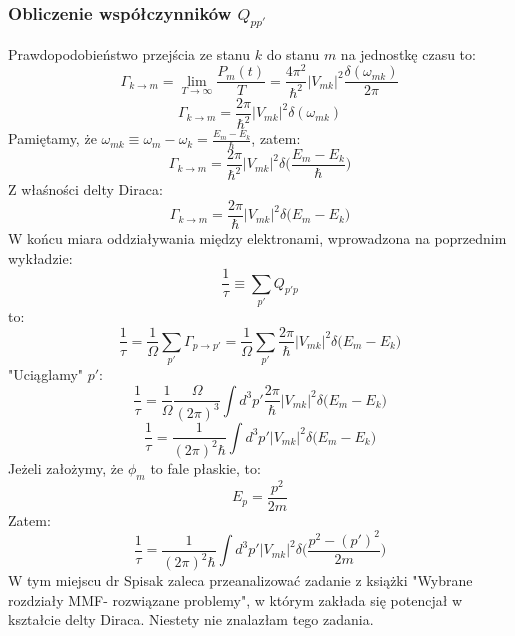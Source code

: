 \subsubsection{Obliczenie współczynników $Q_{pp'}$}
Prawdopodobieństwo przejścia ze stanu $k$ do stanu $m$ na jednostkę czasu to:
\begin{equation}\Gamma_{k\rightarrow m}=\lim_{T\rightarrow\infty}\frac{P_m(t)}{T}=
\frac{4\pi^2}{\hbar^2}|V_{mk}|^2\frac{\delta(\omega_{mk})}{2\pi}
\end{equation}
\begin{equation}\Gamma_{k\rightarrow m}=
\frac{2\pi}{\hbar^2}|V_{mk}|^2{\delta(\omega_{mk})}
\end{equation}
Pamiętamy, że $\omega_{mk}\equiv \omega_m - \omega_k=\frac{E_m-E_k}{\hbar}$, zatem:
\begin{equation}\Gamma_{k\rightarrow m}=
\frac{2\pi}{\hbar^2}|V_{mk}|^2{\delta\Big(\frac{E_m-E_k}{\hbar}\Big)}
\end{equation}
Z właśności delty Diraca:
\begin{equation}\Gamma_{k\rightarrow m}=
\frac{2\pi}{\hbar}|V_{mk}|^2{\delta\Big(E_m-E_k\Big)}
\end{equation}
W końcu miara oddziaływania między elektronami, wprowadzona na poprzednim wykładzie:
\begin{equation}\frac{1}{\tau}\equiv\sum_{p'}Q_{p'p}\end{equation}
to:
\begin{equation}\frac{1}{\tau}=\frac{1}{\Omega}\sum_{p'}\Gamma_{p\rightarrow p'}=
\frac{1}{\Omega}\sum_{p'}\frac{2\pi}{\hbar}|V_{mk}|^2{\delta\Big(E_m-E_k\Big)}
\end{equation}
"Uciąglamy" $p'$:
\begin{equation}\frac{1}{\tau}=
\frac{1}{\Omega}\frac{\Omega}{(2\pi)^3}\int d^3p'\frac{2\pi}{\hbar}|V_{mk}|^2{\delta\Big(E_m-E_k\Big)}
\end{equation}
\begin{equation}\frac{1}{\tau}=
\frac{1}{(2\pi)^2\hbar}\int d^3p'|V_{mk}|^2{\delta\Big(E_m-E_k\Big)}
\end{equation}
Jeżeli założymy, że $\phi_m$ to fale płaskie, to:
\begin{equation}E_p=\frac{p^2}{2m}\end{equation}
Zatem:
\begin{equation}\frac{1}{\tau}=
\frac{1}{(2\pi)^2\hbar}\int d^3p'|V_{mk}|^2{\delta\Big(\frac{p^2-(p')^2}{2m}\Big)}
\end{equation}
W tym miejscu dr Spisak zaleca przeanalizować zadanie z książki "Wybrane rozdziały MMF- rozwiązane problemy", w którym zakłada się potencjał w kształcie delty Diraca. Niestety nie znalazłam tego zadania.
